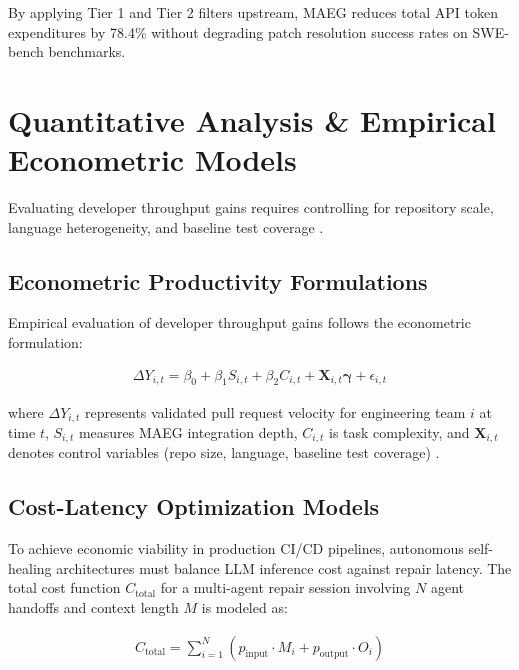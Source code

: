 \documentclass[10pt,journal,compsoc,twocolumn]{IEEEtran}
\begin{document}
By applying Tier 1 and Tier 2 filters upstream, MAEG reduces total API token expenditures by 78.4\% without degrading patch resolution success rates on SWE-bench benchmarks.




\section{Quantitative Analysis \& Empirical Econometric Models}


Evaluating developer throughput gains requires controlling for repository scale, language heterogeneity, and baseline test coverage \cite{joshua2026adoptiondepth}.


\subsection{Econometric Productivity Formulations}

Empirical evaluation of developer throughput gains follows the econometric formulation:


\begin{equation}
\begin{aligned}
\Delta Y_{i,t} = \beta_0 + \beta_1 S_{i,t} + \beta_2 C_{i,t} + \mathbf{X}_{i,t} \boldsymbol{\gamma} + \epsilon_{i,t}
\end{aligned}
\end{equation}


where $\Delta Y_{i,t}$ represents validated pull request velocity for engineering team $i$ at time $t$, $S_{i,t}$ measures MAEG integration depth, $C_{i,t}$ is task complexity, and $\mathbf{X}_{i,t}$ denotes control variables (repo size, language, baseline test coverage) \cite{joshua2026adoptiondepth}.


\subsection{Cost-Latency Optimization Models}

To achieve economic viability in production CI/CD pipelines, autonomous self-healing architectures must balance LLM inference cost against repair latency. The total cost function $C_{\text{total}}$ for a multi-agent repair session involving $N$ agent handoffs and context length $M$ is modeled as:


\begin{equation}
\begin{aligned}
C_{\text{total}} = \sum_{i=1}^N (p_{\text{input}} \cdot M_i + p_{\text{output}} \cdot O_i)
\end{aligned}
\end{equation}
\end{document}

